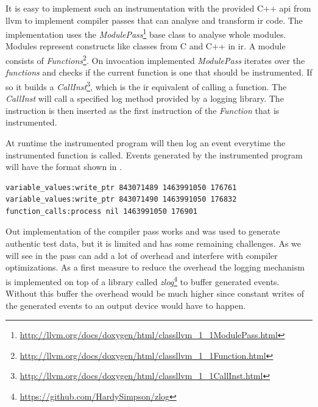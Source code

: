 It is easy to implement such an instrumentation with the provided C++ \gls{api} from \gls{llvm} to implement compiler passes that can analyse and transform \gls{ir} code.
The implementation uses the \emph{ModulePass}\footnote{\url{http://llvm.org/docs/doxygen/html/classllvm_1_1ModulePass.html}} base class to analyse whole modules.
Modules represent constructs like classes from C and C++ in \gls{ir}.
A module consists of \emph{Functions}\footnote{\url{http://llvm.org/docs/doxygen/html/classllvm_1_1Function.html}}.
On invocation implemented \emph{ModulePass} iterates over the \emph{functions} and checks if the current function is one that should be instrumented.
If so it builds a \emph{CallInst}\footnote{\url{http://llvm.org/docs/doxygen/html/classllvm_1_1CallInst.html}}, which is the \gls{ir} equivalent of calling a function.
The \emph{CallInst} will call a specified log method provided by a logging library.
The instruction is then inserted as the first instruction of the \emph{Function} that is instrumented.

At runtime the instrumented program will then log an event everytime the instrumented function is called.
Events generated by the instrumented program will have the format shown in .

\begin{lstlisting}[numbers=none,float,caption={[Trace data format of the instrumentation pass]Trace data generated by the instrumentation pass. Each line represents an event and each event consists of four pieces seperated by spaces: a stream name, an optional value and the timestamp in unix format followed by the amount of microseconds since that timestamp.},label=listing:instrumentation_trace_data]
variable_values:write_ptr 843071489 1463991050 176761
variable_values:write_ptr 843071490 1463991050 176832
function_calls:process nil 1463991050 176901
\end{lstlisting}

Out implementation of the compiler pass works and was used to generate authentic test data, but it is limited and has some remaining challenges.
As we will see in  the pass can add a lot of overhead and interfere with compiler optimizations.
As a first measure to reduce the overhead the logging mechanism is implemented on top of a library called \emph{zlog}\footnote{\url{https://github.com/HardySimpson/zlog}} to buffer generated events.
Without this buffer the overhead would be much higher since constant writes of the generated events to an output device would have to happen.

